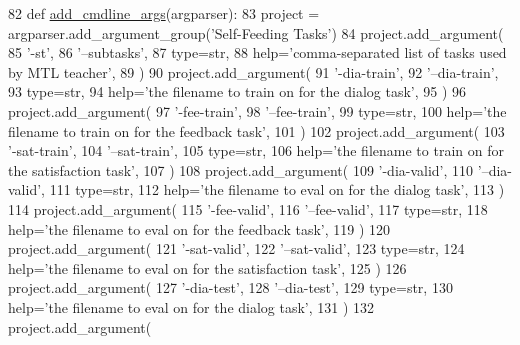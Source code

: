 \begin{DoxyCode}
82     \textcolor{keyword}{def }\hyperlink{namespaceparlai_1_1agents_1_1drqa_1_1config_a62fdd5554f1da6be0cba185271058320}{add\_cmdline\_args}(argparser):
83         project = argparser.add\_argument\_group(\textcolor{stringliteral}{'Self-Feeding Tasks'})
84         project.add\_argument(
85             \textcolor{stringliteral}{'-st'},
86             \textcolor{stringliteral}{'--subtasks'},
87             type=str,
88             help=\textcolor{stringliteral}{'comma-separated list of tasks used by MTL teacher'},
89         )
90         project.add\_argument(
91             \textcolor{stringliteral}{'-dia-train'},
92             \textcolor{stringliteral}{'--dia-train'},
93             type=str,
94             help=\textcolor{stringliteral}{'the filename to train on for the dialog task'},
95         )
96         project.add\_argument(
97             \textcolor{stringliteral}{'-fee-train'},
98             \textcolor{stringliteral}{'--fee-train'},
99             type=str,
100             help=\textcolor{stringliteral}{'the filename to train on for the feedback task'},
101         )
102         project.add\_argument(
103             \textcolor{stringliteral}{'-sat-train'},
104             \textcolor{stringliteral}{'--sat-train'},
105             type=str,
106             help=\textcolor{stringliteral}{'the filename to train on for the satisfaction task'},
107         )
108         project.add\_argument(
109             \textcolor{stringliteral}{'-dia-valid'},
110             \textcolor{stringliteral}{'--dia-valid'},
111             type=str,
112             help=\textcolor{stringliteral}{'the filename to eval on for the dialog task'},
113         )
114         project.add\_argument(
115             \textcolor{stringliteral}{'-fee-valid'},
116             \textcolor{stringliteral}{'--fee-valid'},
117             type=str,
118             help=\textcolor{stringliteral}{'the filename to eval on for the feedback task'},
119         )
120         project.add\_argument(
121             \textcolor{stringliteral}{'-sat-valid'},
122             \textcolor{stringliteral}{'--sat-valid'},
123             type=str,
124             help=\textcolor{stringliteral}{'the filename to eval on for the satisfaction task'},
125         )
126         project.add\_argument(
127             \textcolor{stringliteral}{'-dia-test'},
128             \textcolor{stringliteral}{'--dia-test'},
129             type=str,
130             help=\textcolor{stringliteral}{'the filename to eval on for the dialog task'},
131         )
132         project.add\_argument(

\end{DoxyCode}
